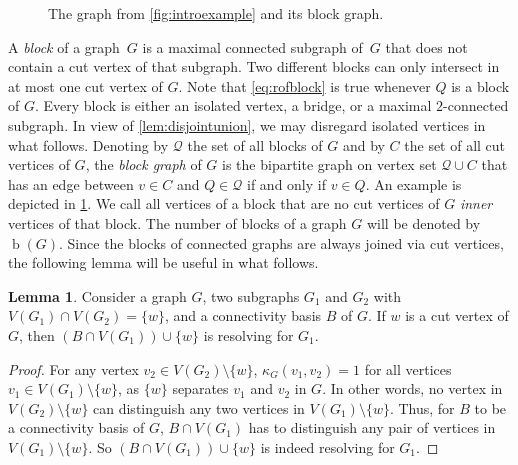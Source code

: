 \documentclass[letterpaper,12pt,headings=normal,parskip=half]{scrartcl}
\DeclareMathOperator{\blocks}{\text{$b$}}
\theoremstyle{definition}
\newtheorem{lemma}[theorem]{Lemma}
\begin{document}
\begin{figure}
    \caption{The graph from \cref{fig:introexample} and its block graph.}
    \label{fig:blockgraphexample}
\end{figure}

A \emph{block} of a graph~$G$ is a maximal connected subgraph of~$G$ that does not contain a cut vertex of that subgraph.  
Two different blocks can only intersect in at most one cut vertex of $G$. 
Note that \cref{eq:rofblock} is true whenever $Q$ is a block of $G$. 
Every block is either an isolated vertex, a bridge, or a maximal \mbox{$2$-connected} subgraph.
In view of \cref{lem:disjointunion}, we may disregard isolated vertices in what follows.
Denoting by $\mathcal{Q}$ the set of all blocks of $G$ and by $C$ the set of all cut vertices of $G$, the \emph{block graph} of $G$ is the bipartite graph on vertex set $\mathcal{Q}\cup C$ that has an edge between $v\in C$ and $Q\in\mathcal{Q}$ if and only if $v\in Q$.
An example is depicted in \cref{fig:blockgraphexample}.
We call all vertices of a block that are no cut vertices of $G$ \emph{inner} vertices of that block.
The number of blocks of a graph $G$ will be denoted by $\blocks(G)$. 
Since the blocks of connected graphs are always joined via cut vertices, the following lemma will be useful in what follows.

\begin{lemma}\label{lem:removeblock}
    Consider a graph $G$, two subgraphs $G_1$ and $G_2$ with $V(G_1)\cap V(G_2)=\{w\}$, and a connectivity basis $B$ of $G$. 
    If $w$ is a cut vertex of $G$, then $(B\cap V(G_1))\cup\{w\}$ is resolving for $G_1$.
\end{lemma}

\begin{proof}
    For any vertex $v_2\in V(G_2)\setminus \{w\}$, $\kappa_G(v_1,v_2)=1$ for all vertices $v_1\in V(G_1)\setminus \{w\}$, as $\{w\}$ separates $v_1$ and $v_2$ in $G$.
    In other words, no vertex in $V(G_2)\setminus \{w\}$ can distinguish any two vertices in $V(G_1)\setminus \{w\}$.
    Thus, for $B$ to be a connectivity basis of $G$, $B\cap V(G_1)$ has to distinguish any pair of vertices in $V(G_1)\setminus \{w\}$. So $(B\cap V(G_1))\cup\{w\}$ is indeed resolving for $G_1$.
\end{proof}
\end{document}
